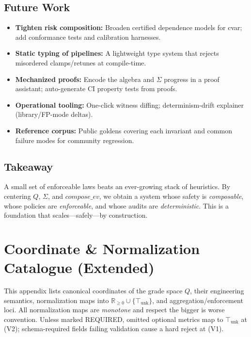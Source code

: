 \documentclass[11pt]{article}
\theoremstyle{plain}
\theoremstyle{definition}
\theoremstyle{remark}
\newcommand{\RR}{\mathbb{R}}
\def\Q{Q}%
\def\Sig{\Sigma}%
\def\composeev{compose\_ev}%
\def\code#1{#1}%
\DeclareRobustCommand{\Q}{\texorpdfstring{\ensuremath{\mathcal{Q}}}{Q}}     %
\DeclareRobustCommand{\Sig}{\texorpdfstring{\ensuremath{\Sigma}}{\Sigma}}   %
\DeclareMathOperator{\composeevOp}{compose\_ev}
\DeclareRobustCommand{\composeev}{\texorpdfstring{\ensuremath{\composeevOp}}{compose\_ev}}
\newcommand{\unk}{\top_{\mathrm{unk}}}         %
\newcommand{\code}[1]{\texttt{\textup{#1}}}    %
\newcommand{\cvar}{\code{cvar}}
\def\Q{Q}%
\def\Sig{\Sigma}%
\def\composeev{compose\_ev}%
\def\code#1{#1}%
\begin{document}
\subsection{Future Work}
\begin{itemize}[leftmargin=1.6em]
  \item \textbf{Tighten risk composition:} Broaden certified dependence models for \cvar{}; add conformance tests and calibration harnesses.
  \item \textbf{Static typing of pipelines:} A lightweight type system that rejects misordered clamps/retunes at compile-time.
  \item \textbf{Mechanized proofs:} Encode the algebra and \(\Sig\) progress in a proof assistant; auto-generate CI property tests from proofs.
  \item \textbf{Operational tooling:} One-click witness diffing; determinism-drift explainer (library/FP-mode deltas).
  \item \textbf{Reference corpus:} Public goldens covering each invariant and common failure modes for community regression.
\end{itemize}

\subsection{Takeaway}
A small set of enforceable laws beats an ever-growing stack of heuristics. By centering \(\Q\), \(\Sig\), and $\composeev$, we obtain a system whose safety is \emph{composable}, whose policies are \emph{enforceable}, and whose audits are \emph{deterministic}. This is a foundation that scales—safely—by construction.

\appendix

\section{Coordinate \& Normalization Catalogue (Extended)}
\label{app:coord-catalogue}

This appendix lists canonical coordinates of the grade space $\Q$, their engineering semantics, normalization maps into $\RR_{\ge 0}\cup\{\unk\}$, and aggregation/enforcement loci. All normalization maps are \emph{monotone} and respect the bigger is worse convention. Unless marked REQUIRED, omitted optional metrics map to $\unk$ at (V2); schema-required fields failing validation cause a hard reject at (V1).
\end{document}
